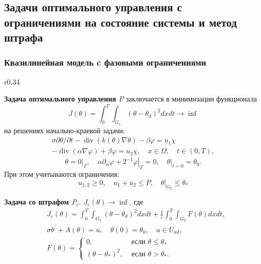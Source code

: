 \subsection{Задачи оптимального управления с ограничениями на состояние системы и метод штрафа}\label{subsec:opt-phase}
\begin{frame}
    \frametitle{Квазилинейная модель c фазовыми ограничениями}
    \begin{wrapfigure}{r}{0.34\textwidth}
    \end{wrapfigure}

    \textbf{Задача оптимального управления $P$} заключается в минимизации функционала
    \[ J(\theta)=\int_{0}^{T} \int_{G_{1}}\left(\theta-\theta_{d}\right)^{2} dx dt \rightarrow \inf \]
    на решениях начально-краевой задачи:
    \begin{equation}
        \label{eq:3_2:1}
        \begin{gathered}
            \sigma \partial \theta / \partial t-\operatorname{div}(k(\theta)
            \nabla \theta)-\beta \varphi=u_{1} \chi \\
            -\operatorname{div}(\alpha \nabla \varphi)+\beta \varphi=u_{2}
            \chi, \quad x \in \Omega, \quad t \in(0, T),
        \end{gathered}
    \end{equation}
    \begin{equation}
        \label{eq:3_2:2}
        \theta=\left.0\right|_{\Gamma},
        \quad \alpha \partial_{n} \varphi
        +\left.2^{-1} \varphi\right|_{\Gamma}=0,
        \left.\quad \theta\right|_{t=0}=\theta_{0}.
    \end{equation}
    При этом учитываются ограничения:
    \[ u_{1,2} \geq 0, \quad u_{1}+u_{2} \leq P, \left.\quad \theta\right|_{G_{2}} \leq \theta_{*} \]

    \textbf{Задача со штрафом $P_{\varepsilon}$}.
    $J_{\varepsilon}(\theta) \rightarrow \inf$, где
    \[
        \begin{aligned}
            & J_{\varepsilon}(\theta)=\int_{0}^{T}
            \int_{G_{1}}\left(\theta-\theta_{d}\right)^{2} dx dt
            +\frac{1}{\varepsilon} \int_{0}^{T}
            \int_{G_{2}} F(\theta) d x d t, \\
            & \sigma \theta^{\prime}+A(\theta)=u,
            \quad \theta(0)=\theta_{0}, \quad u \in U_{a d},\\
            &F(\theta)=
            \begin{cases}
                0, & \text { если } \theta \leq \theta_{*} \\
                \left(\theta-\theta_{*}\right)^{2},
                & \text { если } \theta>\theta_{*}.
            \end{cases}
        \end{aligned}
    \]

\end{frame}
